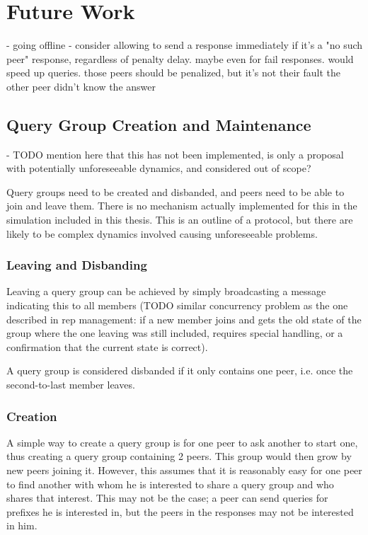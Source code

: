 \chapter{Future Work}
\label{chap:future_work}
- going offline
- consider allowing to send a response immediately if it's a "no such peer"
  response, regardless of penalty delay. maybe even for fail responses. would
  speed up queries. those peers should be penalized, but it's not their fault
  the other peer didn't know the answer

\section{Query Group Creation and Maintenance}
- TODO mention here that this has not been implemented, is only a proposal with
  potentially unforeseeable dynamics, and considered out of scope?

Query groups need to be created and disbanded, and peers need to be able to join
and leave them. There is no mechanism actually implemented for this in the
simulation included in this thesis. This is an outline of a protocol, but there
are likely to be complex dynamics involved causing unforeseeable problems.

\subsection{Leaving and Disbanding}
Leaving a query group can be achieved by simply broadcasting a message
indicating this to all members (TODO similar concurrency problem as the one
described in rep management: if a new member joins and gets the old state of the
group where the one leaving was still included, requires special handling, or a
confirmation that the current state is correct).

A query group is considered disbanded if it only contains one peer, i.e. once
the second-to-last member leaves.

\subsection{Creation}
A simple way to create a query group is for one peer to ask another to start
one, thus creating a query group containing 2 peers. This group would then grow
by new peers joining it. However, this assumes that it is reasonably easy for
one peer to find another with whom he is interested to share a query group and
who shares that interest. This may not be the case; a peer can send queries for
prefixes he is interested in, but the peers in the responses may not be
interested in him.

